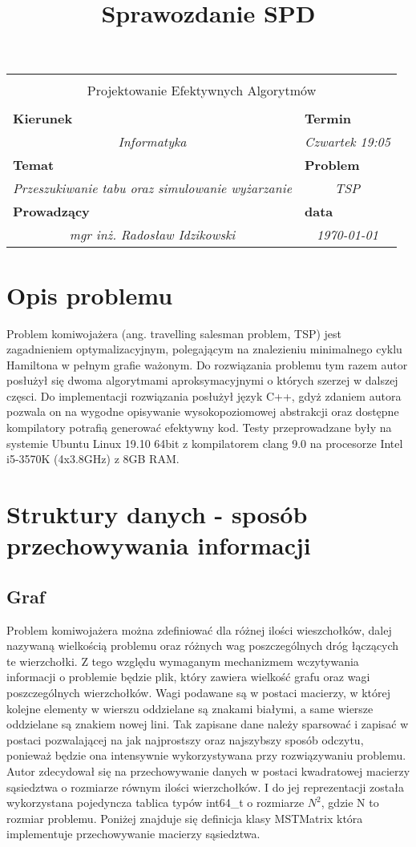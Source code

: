 \documentclass[polish,polish,a4paper]{article}
\title{Sprawozdanie SPD}
\newcommand{\name}[1]{\sffamily\bfseries\scriptsize #1}
\newcommand{\frontpage}[8]{

\vspace{2cm}

\begin{tabular}{|p{0.72\textwidth}|p{0.28\textwidth}|}
\hline
\multicolumn{2}{|c|}{}\\
\multicolumn{2}{|c|}{{\LARGE #1}}\\
\multicolumn{2}{|c|}{}\\
\hline
\name{Kierunek} & \name{Termin}\\
\multicolumn{1}{|c|}{\textit{#2}} & \multicolumn{1}{|c|}{\textit{#3}} \\
\hline
\name{Temat} & \name{Problem}\\
\multicolumn{1}{|c|}{\textit{#4}} & \multicolumn{1}{|c|}{\textit{#5}} \\
\hline
\name{Prowadzący} & \name{data}\\
\multicolumn{1}{|c|}{\textit{mgr inż. Radosław Idzikowski}} & \multicolumn{1}{|c|}{\textit{#6}} \\
\hline
\end{tabular}

}
\begin{document}
\frontpage{Projektowanie Efektywnych Algorytmów}{Informatyka}{Czwartek 19:05}{Przeszukiwanie tabu oraz simulowanie wyżarzanie}{TSP}{\today}
\pagestyle{empty}
\newpage

\section{Opis problemu}

Problem komiwojażera (ang. travelling salesman problem, TSP) jest zagadnieniem optymalizacyjnym, polegającym na znalezieniu minimalnego cyklu Hamiltona w pełnym grafie ważonym\cite{TSPWiki:1}. Do rozwiązania problemu tym razem autor posłużył się dwoma algorytmami aproksymacyjnymi o których szerzej w dalszej częsci.
Do implementacji rozwiązania posłużył język C++, gdyż zdaniem autora pozwala on na wygodne opisywanie wysokopoziomowej abstrakcji oraz dostępne kompilatory
potrafią generować efektywny kod. Testy przeprowadzane były na systemie Ubuntu Linux 19.10 64bit z kompilatorem clang 9.0 na procesorze Intel i5-3570K (4x3.8GHz) z 8GB RAM.

\section{Struktury danych - sposób przechowywania informacji}

\subsection{Graf}

Problem komiwojażera można zdefiniować dla różnej ilości wieszchołków, dalej nazywaną wielkością problemu oraz różnych wag poszczególnych dróg łączących te wierzchołki.
Z tego względu wymaganym mechanizmem wczytywania informacji o problemie będzie plik, który zawiera wielkość grafu oraz wagi poszczególnych wierzchołków.
Wagi podawane są w postaci macierzy, w której kolejne elementy w wierszu oddzielane są znakami białymi, a same wiersze oddzielane są znakiem nowej lini.
Tak zapisane dane należy sparsować i zapisać w postaci pozwalającej na jak najprostszy oraz najszybszy sposób odczytu, ponieważ będzie ona intensywnie wykorzystywana przy rozwiązywaniu problemu.
Autor zdecydował się na przechowywanie danych w postaci kwadratowej macierzy sąsiedztwa o rozmiarze równym ilości wierzchołków.
I do jej reprezentacji została wykorzystana pojedyncza tablica typów int64\_t o rozmiarze $N^{2}$, gdzie N to rozmiar problemu.
Poniżej znajduje się definicja klasy MSTMatrix która implementuje przechowywanie macierzy sąsiedztwa.
\end{document}
